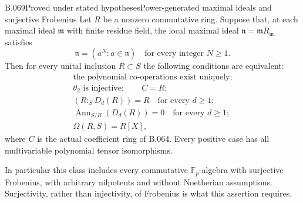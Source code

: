 \begin{saresult}{B.069}{Proved under stated hypotheses}{Power-generated maximal ideals and surjective Frobenius}
Let $R$ be a nonzero commutative ring. Suppose that, at each maximal ideal
$\mathfrak m$ with finite residue field, the local maximal ideal
$\mathfrak n=\mathfrak mR_{\mathfrak m}$ satisfies
\[
             \mathfrak n=(a^N:a\in\mathfrak n)
             \quad\text{for every integer }N\ge1.          \tag{B69.1}
\]
Then for every unital inclusion $R\subset S$ the following conditions
are equivalent:
\[
\begin{gathered}
 \text{the polynomial co-operations exist uniquely};\\
 \theta_2\text{ is injective};\qquad C=R;\\
 (R:_S D_d(R))=R\quad\text{for every }d\ge1;\\
 \operatorname{Ann}_{S/R}(D_d(R))=0\quad\text{for every }d\ge1;\\
 \Omega(R,S)=R[X],                                        \tag{B69.2}
\end{gathered}
\]
where $C$ is the actual coefficient ring of B.064. Every positive case
has all multivariable polynomial tensor isomorphisms.

In particular this class includes every commutative $\mathbb F_p$-algebra
with surjective Frobenius, with arbitrary nilpotents and without
Noetherian assumptions. Surjectivity, rather than injectivity, of
Frobenius is what this assertion requires.
\end{saresult}

